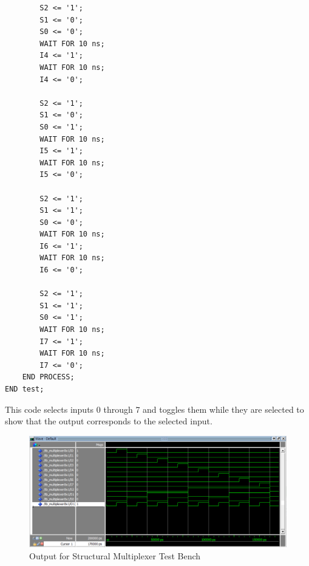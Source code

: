 \documentclass[12pt]{article}
\begin{document}
\begin{verbatim}
        S2 <= '1';
        S1 <= '0';
        S0 <= '0';
        WAIT FOR 10 ns;
        I4 <= '1';
        WAIT FOR 10 ns;
        I4 <= '0';

        S2 <= '1';
        S1 <= '0';
        S0 <= '1';
        WAIT FOR 10 ns;
        I5 <= '1';
        WAIT FOR 10 ns;
        I5 <= '0';

        S2 <= '1';
        S1 <= '1';
        S0 <= '0';
        WAIT FOR 10 ns;
        I6 <= '1';
        WAIT FOR 10 ns;
        I6 <= '0';

        S2 <= '1';
        S1 <= '1';
        S0 <= '1';
        WAIT FOR 10 ns;
        I7 <= '1';
        WAIT FOR 10 ns;
        I7 <= '0';
    END PROCESS;
END test;

\end{verbatim}
This code selects inputs 0 through 7 and toggles them while they are selected to show that the output corresponds to the selected input.


\begin{figure}[h]
\caption{Output for Structural Multiplexer Test Bench}
\centering
\includegraphics[width=\textwidth]{./diagrams/mux_structural.png}
\end{figure}

\clearpage
\end{document}
